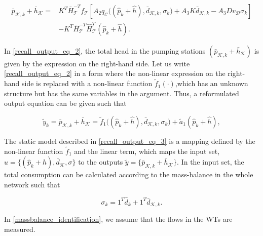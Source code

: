 \vspace{-4mm}
\begin{align}
  \label{recall_output_eq_2}
      \bar{p}_{\mathcal{K},k} + \bar{h}_{\mathcal{K}} = & \nonumber K^T \bar{H}^{-T}_{\mathcal{T}}f_{\mathcal{T}}[A_2 q_{\mathcal{C}}\big ((\hat{p}_k + \hat{h}),\bar{d}_{\mathcal{K},k}, \sigma_k \big) + A_3 K \bar{d}_{\mathcal{K},k} - A_3 D v_{\mathcal{D}} \sigma_k]   \\ &  - K^T\bar{H}^{-T}_{\mathcal{T}}\hat{H}^{T}_{\mathcal{T}} (\hat{p}_k + \hat{h}) .
\end{align}

\vspace{-4mm}
In \eqref{recall_output_eq_2}, the total head in the pumping stations $(\bar{p}_{\mathcal{K},k} + \bar{h}_{\mathcal{K}})$ is given by the expression on the right-hand side. Let us write \eqref{recall_output_eq_2} in a form where the non-linear expression on the right-hand side is replaced with a non-linear function $\tilde{f}_1(\cdot)$,which has an unknown structure but has the same variables in the argument. Thus, a reformulated output equation can be given such that 

 \begin{equation}
  \label{recall_output_eq_3}
     \tilde{y}_k = \bar{p}_{\mathcal{K},k} + \bar{h}_{\mathcal{K}} = \tilde{f}_1 \big((\hat{p}_k + \hat{h}),\bar{d}_{\mathcal{K},k}, \sigma_k\big) + \tilde{a}_1 (\hat{p}_k + \hat{h}), 
\end{equation} 

The static model described in \eqref{recall_output_eq_3} is a mapping defined by the non-linear function $\tilde{f}_1$ and the linear term, which maps the input set, $u = \{(\hat{p}_k + \hat{h}), \bar{d}_{\mathcal{K}}, \sigma \}$ to the outputs $\tilde{y} = \{ \bar{p}_{\mathcal{K},k} + \bar{h}_{\mathcal{K}} \}$. In the input set, the total consumption can be calculated according to the mass-balance in the whole network such that

\begin{equation}
\label{massbalance_identification}
 \sigma_k = 1^T \hat{d}_k + 1^T \bar{d}_{\mathcal{K},k}.
\end{equation}

 In \eqref{massbalance_identification}, we assume that the flows in the WTs are measured. 


